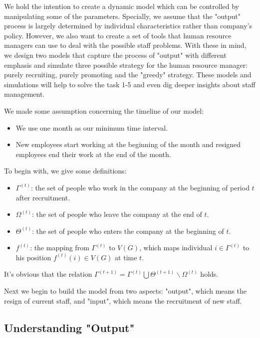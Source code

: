 \documentclass[tcn = 37075, sheet = true, abstract = true]{mcmthesis}
\begin{document}
We hold the intention to create a dynamic model which can be controlled by manipulating some of the parameters. Specially, we assume that the "output" process is largely determined by individual characteristics rather than company's policy. However, we also want to create a set of tools that human resource managers can use to deal with the possible staff problems. With these in mind, we design two models that capture the process of "output" with different emphasis and simulate three possible strategy for the human resource manager: purely recruiting, purely promoting and the "greedy" strategy. These models and simulations will help to solve the task 1-5 and even dig deeper insights about staff management. 

We made some assumption concerning the timeline of our model:
\begin{itemize}
\item We use one month as our minimum time interval.
\item New employees start working at the beginning of the month and resigned employees end their work at the end of the month.
\end{itemize}

To begin with, we give some definitions: 
\begin{itemize}
\item $\Gamma^{(t)}$: the set of people who work in the company at the beginning of period $t$ after recruitment.
\item $\Omega^{(t)}$: the set of people who leave the company at the end of $t$. \item $\Theta^{(t)}$: the set of people who enters the company at the beginning of $t$. 
\item $f^{(t)}$: the mapping from $\Gamma^{(t)}$ to $V(G)$, which maps individual $i\in \Gamma^{(t)}$ to his position $f^{(t)}(i) \in V(G)$ at time $t$.
\end{itemize}

It's obvious that the relation $\Gamma^{(t+1)}=\Gamma^{(t)}\bigcup \Theta ^{(t+1)} \backslash \Omega^{(t)}$ holds.

Next we begin to build the model from two aspects: "output", which means the resign of current staff, and "input", which means the recruitment of new staff.

\subsection{Understanding "Output"}
\end{document}
